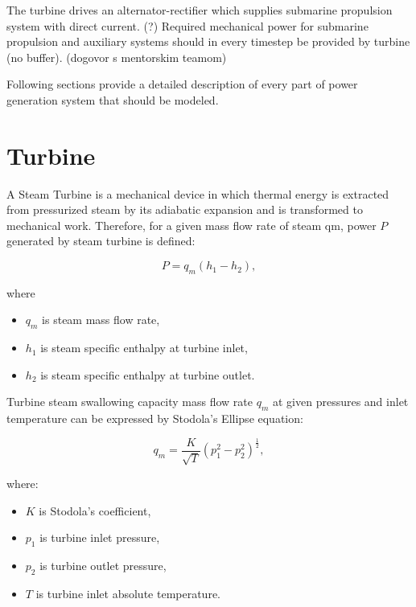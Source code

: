 \documentclass{article}
\begin{document}
	The turbine drives an alternator-rectifier which supplies submarine propulsion system with direct current. (?) Required mechanical power for submarine propulsion and auxiliary systems should in every timestep be provided by turbine (no buffer). (dogovor s mentorskim teamom)
	
	Following sections provide a detailed description of every part of power generation system that should be modeled.
	
	\section{Turbine}
	
	A Steam Turbine is a mechanical device in which thermal energy is extracted from pressurized steam by its adiabatic expansion and is transformed to mechanical work.  Therefore, for a given mass flow rate of steam qm, power $P$ generated by steam turbine is defined:
	
	\begin{equation}\label{eq:power}
		P = q_m(h_1 - h_2),
	\end{equation}
	
	\noindent
	where 
	
	\begin{itemize}
		\item $q_m$ is steam mass flow rate, 
		\item $h_1$ is steam specific enthalpy at turbine inlet,
		\item $h_2$ is steam specific enthalpy at turbine outlet.
	\end{itemize}

	Turbine steam swallowing capacity mass flow rate $q_m$ at given pressures and inlet temperature can be expressed by Stodola’s Ellipse equation:
	
	\begin{equation}\label{eq:stodola}
		q_m = \frac{K}{\sqrt{T}}(p_1^2 - p_2^2)^\frac{1}{2},
	\end{equation}
	
	\noindent
	where:
	
	\begin{itemize}
		\item $K$ is Stodola’s coefficient, 
		\item $p_1$ is turbine inlet pressure,
		\item $p_2$ is turbine outlet pressure,
		\item $T$ is turbine inlet absolute temperature.
	\end{itemize}
	
\end{document}
